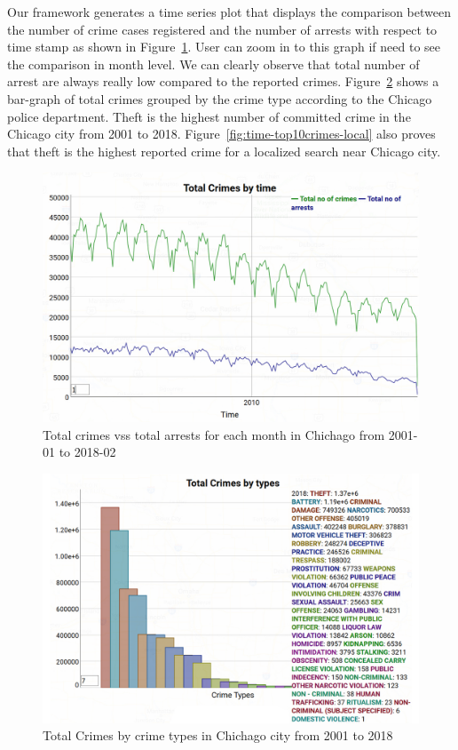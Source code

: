 Our framework generates a time series plot that displays the
comparison between the number of crime cases registered and the number
of arrests with respect to time stamp as shown in
Figure~\ref{fig:time-top10crimes-local-stat1}. User can zoom in to
this graph if need to see the comparison in month level. We can
clearly observe that total number of arrest are always really low
compared to the reported
crimes. Figure~\ref{fig:year-top10crimes-local-stat2} shows a
bar-graph of total crimes grouped by the crime type according to the
Chicago police department. Theft is the highest number of committed
crime in the Chicago city from 2001 to 2018.
Figure~\ref{fig:time-top10crimes-local} also proves that theft is the
highest reported crime for a localized search near Chicago city.

\begin{figure}[htb]
	\centering\includegraphics[width=\columnwidth]{images/stat1.jpg}
	\caption{Total crimes vss total arrests for each month in Chichago from 2001-01 to 2018-02}\label{fig:time-top10crimes-local-stat1}
\end{figure}

\begin{figure}[htb]
	\centering\includegraphics[width=\columnwidth]{images/stat2.jpg}
	\caption{Total Crimes by crime types in Chichago city from 2001 to 2018}\label{fig:year-top10crimes-local-stat2}
\end{figure}

